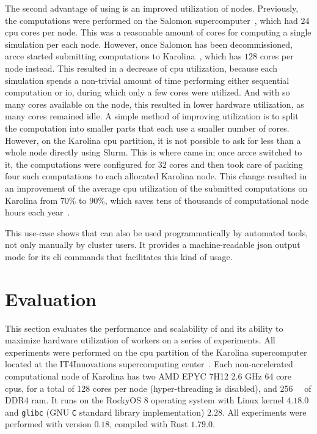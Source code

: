 The second advantage of using \hyperqueue{} is an improved utilization of nodes.
Previously, the computations were performed on the Salomon supercomputer~\cite{salomon},
which had $24$ \gls{cpu} cores per node. This was a reasonable
amount of cores for computing a single simulation per each node. However, once Salomon has been
decommissioned, \gls{arcce} started submitting computations to
Karolina~\cite{karolina}, which has $128$ cores per node instead. This
resulted in a decrease of \gls{cpu} utilization, because each simulation spends a
non-trivial amount of time performing either sequential computation or \gls{io},
during which only a few cores were utilized. And with so many cores available on the node, this
resulted in lower hardware utilization, as many cores remained idle. A simple method of improving
utilization is to split the computation into smaller parts that each use a smaller number of cores.
However, on the Karolina \gls{cpu} partition, it is not possible to ask for less than
a whole node directly using Slurm. This is where \hyperqueue{} came in; once
\gls{arcce} switched to it, the computations were configured for $32$
cores and \hyperqueue{} then took care of packing four such computations to each
allocated Karolina node. This change resulted in an improvement of the average
\gls{cpu} utilization of the submitted computations on Karolina from
$70\%$ to $90\%$, which saves tens of thousands of computational
node hours each year~\cite{cern-hq}.

This use-case shows that \hyperqueue{} can also be used programmatically by automated
tools, not only manually by cluster users. It provides a machine-readable \gls{json}
output mode for its \gls{cli} commands that facilitates this kind of usage.

\section{Evaluation}
\label{hq:evaluation}
This section evaluates the performance and scalability of \hyperqueue{} and its ability
to maximize hardware utilization of workers on a series of experiments. All experiments were
performed on the \gls{cpu} partition of the Karolina
supercomputer~\cite{karolina} located at the IT4Innovations supercomputing
center~\cite{it4i}. Each non-accelerated computational node of Karolina has two AMD
EPYC\texttrademark{} 7H12 2.6 GHz 64 core \glspl{cpu}, for a total of 128 cores
per node (hyper-threading is disabled), and \SI{256}{\gibi\byte} of DDR4
\gls{ram}. It runs on the RockyOS 8 operating system with Linux kernel
$4.18.0$ and \texttt{glibc} (GNU \texttt{C} standard library implementation) $2.28$. All experiments were
performed with \hyperqueue{} version $0.18$, compiled with Rust
$1.79.0$.

